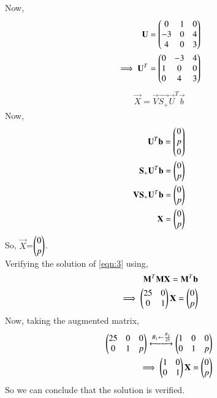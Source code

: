 \documentclass[journal,12pt,twocolumn]{IEEEtran}
\renewcommand\thesection{\arabic{section}}
\begin{document}
Now,
\begin{align}
\mathbf{U} = \begin{pmatrix}0 & 1 & 0\\-3 & 0 & 4\\4 & 0 & 3\end{pmatrix}\\
\implies \mathbf{U}^T = \begin{pmatrix}0 & -3 & 4\\1 & 0 & 0\\0 & 4 & 3\end{pmatrix}\\
\end{align}
\begin{align}
\vec{X} = \vec{V} \vec{S_+} \vec{U}^T \vec{b}
\end{align}
Now,
\begin{align}
\mathbf{U}^T \mathbf{b} = \begin{pmatrix}0\\p\\0\end{pmatrix}\\
\mathbf{S_+} \mathbf{U}^T \mathbf{b} = \begin{pmatrix}0\\ p\end{pmatrix}\\
\mathbf{V} \mathbf{S_+} \mathbf{U}^T \mathbf{b} = \begin{pmatrix}0 \\ p\end{pmatrix}\\
\mathbf{X}= \begin{pmatrix}0\\p\end{pmatrix}
\label{eqn:3}
\end{align}
So, $\vec{X}$=$\begin{pmatrix}0\\p\end{pmatrix}$.\\
Verifying the solution of \ref{eqn:3} using,
\begin{align}
\mathbf{M}^T \mathbf{M} \mathbf{X} = \mathbf{M}^T \mathbf{b}\\
\implies \begin{pmatrix}25 & 0\\0 & 1\end{pmatrix}\mathbf{X} = \begin{pmatrix}0\\p\end{pmatrix}
\end{align}
Now, taking the augmented matrix,
\begin{align}
\begin{pmatrix}25 & 0 & 0\\0 & 1 & p\end{pmatrix} \xleftrightarrow[]{R_1\leftarrow \frac{R_1}{25}}\begin{pmatrix}1 & 0 & 0\\0 & 1 & p\end{pmatrix}\\
\implies \begin{pmatrix}1 & 0\\0 & 1\end{pmatrix}\mathbf{X}=\begin{pmatrix}0\\p\end{pmatrix}
\end{align}
So we can conclude that the solution is verified.
\end{document}
